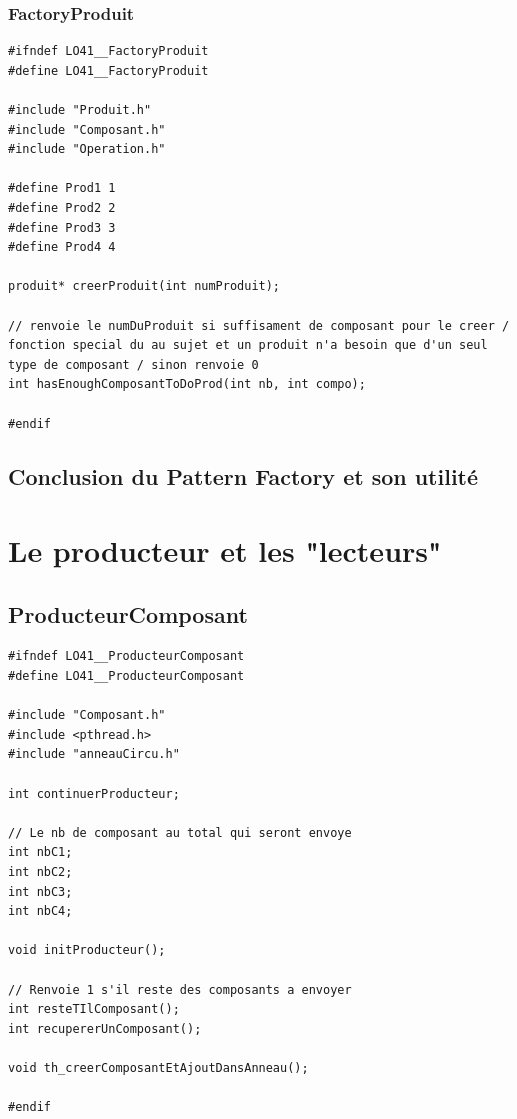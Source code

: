 \documentclass{report}
\begin{document}
\subsubsection{FactoryProduit}
\begin{lstlisting}[caption=Factory des Produits]
#ifndef LO41__FactoryProduit
#define LO41__FactoryProduit

#include "Produit.h"
#include "Composant.h"
#include "Operation.h"

#define Prod1 1
#define Prod2 2
#define Prod3 3
#define Prod4 4

produit* creerProduit(int numProduit);

// renvoie le numDuProduit si suffisament de composant pour le creer / fonction special du au sujet et un produit n'a besoin que d'un seul type de composant / sinon renvoie 0
int hasEnoughComposantToDoProd(int nb, int compo);

#endif
\end{lstlisting}

\subsection{Conclusion du Pattern Factory et son utilité}

\section{Le producteur et les "lecteurs"}
\subsection{ProducteurComposant}
\begin{lstlisting}[caption=Représentation du producteur de composant]
#ifndef LO41__ProducteurComposant
#define LO41__ProducteurComposant

#include "Composant.h"
#include <pthread.h>
#include "anneauCircu.h"

int continuerProducteur;

// Le nb de composant au total qui seront envoye
int nbC1;
int nbC2;
int nbC3;
int nbC4;

void initProducteur();

// Renvoie 1 s'il reste des composants a envoyer
int resteTIlComposant();
int recupererUnComposant();

void th_creerComposantEtAjoutDansAnneau();
    
#endif
\end{lstlisting}
\end{document}

